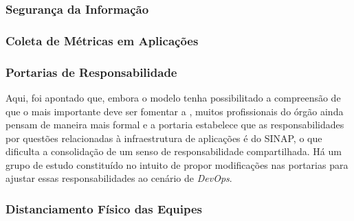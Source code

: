 \subsubsection{Segurança da Informação}

\subsubsection{Coleta de Métricas em Aplicações}

\subsubsection{Portarias de Responsabilidade}

Aqui, foi apontado que, embora o modelo tenha possibilitado a compreensão de que
o mais importante deve ser fomentar a , muitos
profissionais do órgão ainda pensam de maneira mais formal e a portaria
estabelece que as responsabilidades por questões relacionadas à infraestrutura
de aplicações é do \acrshort{SINAP}, o que dificulta a consolidação de um senso
de responsabilidade compartilhada. Há um grupo de estudo constituído no intuito
de propor modificações nas portarias para ajustar essas responsabilidades ao
cenário de {\it DevOps}.

\subsubsection{Distanciamento Físico das Equipes}
